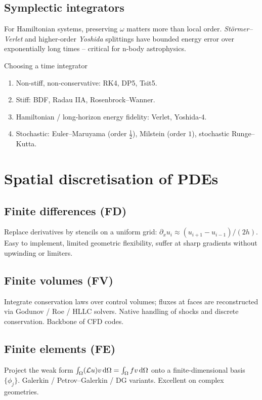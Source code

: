 \subsection{Symplectic integrators}
For Hamiltonian systems, preserving $\omega$ matters more than local
order. \emph{St\"ormer--Verlet} and higher-order \emph{Yoshida}
splittings have bounded energy error over exponentially long times --
critical for n-body astrophysics.

\begin{recipe}{Choosing a time integrator}
\begin{enumerate}
\item Non-stiff, non-conservative: RK4, DP5, Tsit5.
\item Stiff: BDF, Radau IIA, Rosenbrock--Wanner.
\item Hamiltonian / long-horizon energy fidelity: Verlet, Yoshida-4.
\item Stochastic: Euler--Maruyama (order $\tfrac12$), Milstein
(order $1$), stochastic Runge--Kutta.
\end{enumerate}
\end{recipe}

\section{Spatial discretisation of PDEs}
\subsection{Finite differences (FD)}
Replace derivatives by stencils on a uniform grid:
$\partial_x u_i \approx (u_{i+1}-u_{i-1})/(2h)$. Easy to implement,
limited geometric flexibility, suffer at sharp gradients without
upwinding or limiters.

\subsection{Finite volumes (FV)}
Integrate conservation laws over control volumes; fluxes at faces are
reconstructed via Godunov / Roe / HLLC solvers. Native handling of
shocks and discrete conservation. Backbone of CFD codes.

\subsection{Finite elements (FE)}
Project the weak form $\int_\Omega(\mathcal{L} u)v\,\mathrm{d}\Omega=\int_\Omega
fv\,\mathrm{d}\Omega$ onto a finite-dimensional basis $\{\phi_j\}$.
Galerkin / Petrov--Galerkin / DG variants. Excellent on complex
geometries.


